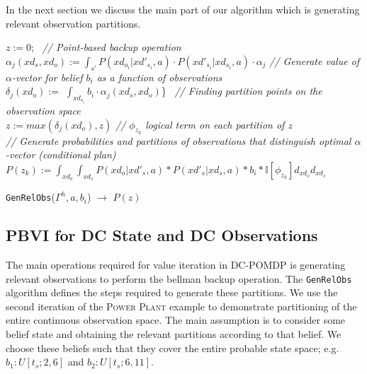 \documentclass{article} %
\begin{document}
In the next section we discuss the main part of our algorithm which is generating relevant observation partitions.
\incmargin{.5em}
\linesnumbered
\begin{algorithm}[t!]
\vspace{-.5mm}
\dontprintsemicolon
{}

\Begin
{
	$z:=0$;\	
		{
		\emph{// Point-based backup operation}\\
    	$\alpha_j(xd_s,xd_o) := \int_{s'} P(xd_{o_i}|xd'_{s_i},a) \cdot P(xd'_{s_i}| xd_{s_i},a)\cdot \alpha_j $\;
		}  
		{
		\emph{// Generate value of $\alpha$-vector for belief $b_i$ as a function of observations}\\
		$\delta_{j}(xd_o) := $ $\int_{xd_{s_i}} b_i \cdot \alpha_j(xd_s,xd_o)$\}\ \;
		}
		{
		\emph{// Finding partition points on the observation space}\\
		$z := max(\delta_j(xd_o),z)$\;
    	}
    	\emph{// $\phi_{z_k}$ logical term on each partition of $z$}\\
    	\emph{// Generate probabilities and partitions of observations that distinguish optimal $\alpha$-vector (conditional plan)}\\
   		$P(z_k) := \int_{xd_o}\int_{xd_s} P(xd_o|xd'_s,a)*P(xd'_s|xd_s,a)*b_i* \mathbb{I}[\phi_{z_k}] d_{xd_o} d_{xd_s}$ \;
    \Return{$P(z)$} \;
}
\caption{\footnotesize \texttt{GenRelObs}($\Gamma^h,a,b_i$) $\longrightarrow$ $P(z)$ }
\vspace{-1mm}
\end{algorithm}
\decmargin{.5em}
\subsection{PBVI for DC State and DC Observations} 
The main operations required for value iteration in DC-POMDP is generating relevant observations to perform the bellman backup operation. 
The \texttt{GenRelObs} algorithm defines the steps required to generate these partitions. 
We use the second iteration of the \textsc{Power Plant} example to demonstrate partitioning of the entire continuous observation space. The main assumption is to consider some belief state and obtaining the relevant partitions according to that belief. We choose these beliefs such that they cover the entire probable state space; e.g. $b_1: U[t_s;2,6]$ and $b_2: U[t_s;6,11]$.
\end{document}
